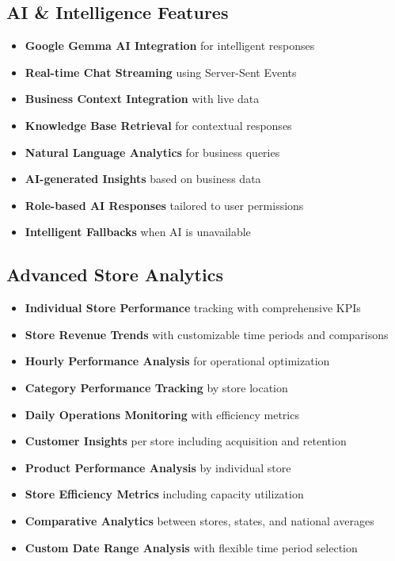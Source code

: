 \documentclass[11pt,a4paper]{article}
\begin{document}
\subsection{AI \& Intelligence Features}

\begin{itemize}[leftmargin=*]
    \item \textbf{Google Gemma AI Integration} for intelligent responses
    \item \textbf{Real-time Chat Streaming} using Server-Sent Events
    \item \textbf{Business Context Integration} with live data
    \item \textbf{Knowledge Base Retrieval} for contextual responses
    \item \textbf{Natural Language Analytics} for business queries
    \item \textbf{AI-generated Insights} based on business data
    \item \textbf{Role-based AI Responses} tailored to user permissions
    \item \textbf{Intelligent Fallbacks} when AI is unavailable
\end{itemize}

\subsection{Advanced Store Analytics}

\begin{itemize}[leftmargin=*]
    \item \textbf{Individual Store Performance} tracking with comprehensive KPIs
    \item \textbf{Store Revenue Trends} with customizable time periods and comparisons
    \item \textbf{Hourly Performance Analysis} for operational optimization
    \item \textbf{Category Performance Tracking} by store location
    \item \textbf{Daily Operations Monitoring} with efficiency metrics
    \item \textbf{Customer Insights} per store including acquisition and retention
    \item \textbf{Product Performance Analysis} by individual store
    \item \textbf{Store Efficiency Metrics} including capacity utilization
    \item \textbf{Comparative Analytics} between stores, states, and national averages
    \item \textbf{Custom Date Range Analysis} with flexible time period selection
\end{itemize}
\end{document}
